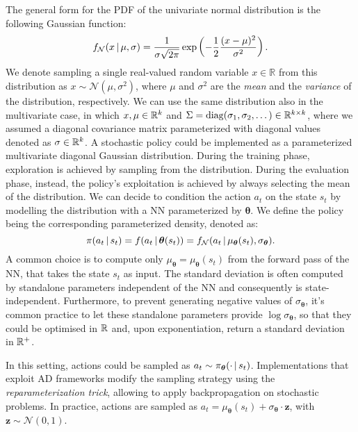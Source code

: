 \begin{example*}
%
\label{example:diagonal_gaussian_policy}
The general form for the \ac{PDF} of the univariate normal distribution is the following Gaussian function:
%
\begin{equation}
    \label{eq:gaussian_function}
    f_{\mathcal{N}}(x \operatorname{\mid} \mu, \sigma)
    = \frac{1}{\sigma \sqrt{2\pi}} \exp \left( -\frac{1}{2}\frac{(x - \mu)^2}{\sigma^2} \right).
\end{equation}
%
We denote sampling a single real-valued random variable $x \in \mathbb{R}$ from this distribution as $x \sim \mathcal{N}(\mu, \sigma^2)$, where $\mu$ and $\sigma^2$ are the \emph{mean} and the \emph{variance} of the distribution, respectively.
We can use the same distribution also in the multivariate case, in which $x, \mu \in \mathbb{R}^k$ and $\Sigma = \operatorname{diag}(\sigma_1, \sigma_2, \dots) \in \mathbb{R}^{k\times k}$, where we assumed a diagonal covariance matrix parameterized with diagonal values denoted as $\sigma \in \mathbb{R}^k$.
A stochastic policy could be implemented as a parameterized multivariate diagonal Gaussian distribution.
During the training phase, exploration is achieved by sampling from the distribution.
During the evaluation phase, instead, the policy's exploitation is achieved by always selecting the mean of the distribution.
We can decide to condition the action $a_t$ on the state $s_t$ by modelling the distribution with a \ac{NN} parameterized by $\boldsymbol{\theta}$.
We define the policy being the corresponding parameterized density, denoted as:
%
\begin{equation*}
    \pi(a_t \operatorname{\mid} s_t) = 
    f(a_t \operatorname{\mid} \boldsymbol{\theta}(s_t)) = f_{\mathcal{N}}(a_t \operatorname{\mid} \mu_{\boldsymbol{\theta}}(s_t), \sigma_{\boldsymbol{\theta}})
    .
\end{equation*}
%
A common choice is to compute only $\mu_{\boldsymbol{\theta}} =\mu_{\boldsymbol{\theta}}(s_t) $ from the forward pass of the \ac{NN}, that takes the state $s_t$ as input.
The standard deviation is often computed by standalone parameters independent of the \ac{NN} and consequently is state-independent.
Furthermore, to prevent generating negative values of $\sigma_{\boldsymbol{\theta}}$, it's common practice to let these standalone parameters provide $\log \sigma_{\boldsymbol{\theta}}$, so that they could be optimised in $\mathbb{R}$ and, upon exponentiation, return a standard deviation in $\mathbb{R}^+$.

In this setting, actions could be sampled as $a_t \sim \pi_{\boldsymbol{\theta}}(\cdot \operatorname{\mid} s_t)$.
Implementations that exploit \ac{AD} frameworks modify the sampling strategy using the \emph{reparameterization trick}, allowing to apply backpropagation on stochastic problems.
In practice, actions are sampled as $a_t =
\mu_{\boldsymbol{\theta}}(s_t) + \sigma_{\boldsymbol{\theta}} \cdot \boldsymbol{z}$, with $\boldsymbol{z} \sim \mathcal{N}(0, 1)$.
%
\end{example*}

